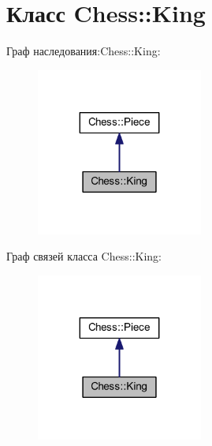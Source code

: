 \hypertarget{class_chess_1_1_king}{}\section{Класс Chess\+:\+:King}
\label{class_chess_1_1_king}


Граф наследования\+:Chess\+:\+:King\+:\nopagebreak
\begin{figure}[H]
\begin{center}
\leavevmode
\includegraphics[width=155pt]{class_chess_1_1_king__inherit__graph}
\end{center}
\end{figure}


Граф связей класса Chess\+:\+:King\+:\nopagebreak
\begin{figure}[H]
\begin{center}
\leavevmode
\includegraphics[width=155pt]{class_chess_1_1_king__coll__graph}
\end{center}
\end{figure}
